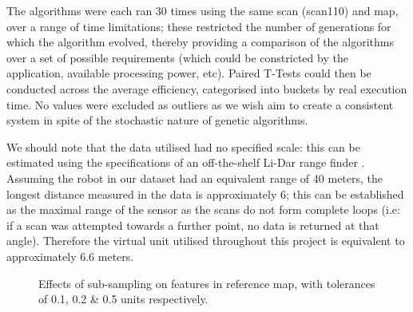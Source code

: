 \documentclass[authoryearcitations]{UoYCSproject}
\begin{document}
The algorithms were each ran 30 times using the same scan (scan110) and map, over a range of time limitations; these restricted the number of generations for which the algorithm evolved, thereby providing a comparison of the algorithms over a set of possible requirements (which could be constricted by the application, available processing power, etc). Paired T-Tests could then be conducted across the average efficiency, categorised into buckets by real execution time. No values were excluded as outliers  as we wish aim to create a consistent system in spite of the stochastic nature of genetic algorithms. \newline

We should note that the data utilised had no specified scale: this can be estimated using the specifications of an off-the-shelf Li-Dar range finder \cite{noauthor_undated-bu}. Assuming the robot in our dataset had an equivalent range of 40 meters, the longest distance measured in the data is approximately 6; this can be established as the maximal range of the sensor as the scans do not form complete loops (i.e: if a scan was attempted towards a further point, no data is returned at that angle). Therefore the virtual unit utilised throughout this project is equivalent to approximately 6.6 meters. \newline

\begin{figure}[ht]
\begin{subfigure}[b]{0.30\textwidth}
\end{subfigure}
\begin{subfigure}[b]{0.30\textwidth}
\end{subfigure}
\begin{subfigure}[b]{0.30\textwidth}
\end{subfigure}
\caption{Effects of sub-sampling on features in reference map, with tolerances of 0.1, 0.2 \& 0.5 units respectively.}
\label{fig:map_density}
\end{figure}
\end{document}
